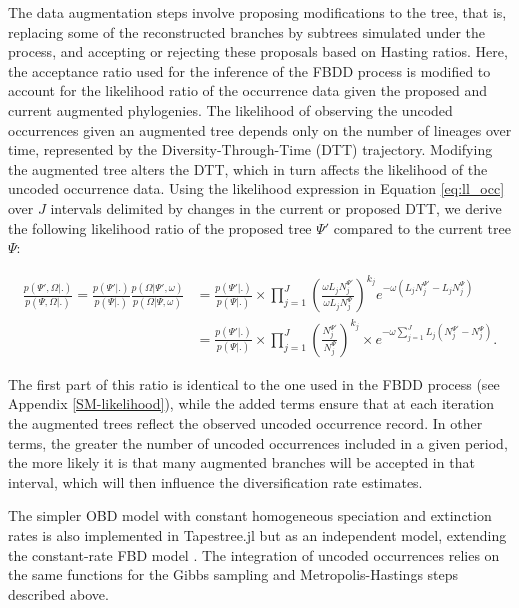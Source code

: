 \documentclass[oupdraft]{sysbio}
\newcommand{\revised}[1]{{\color{blue} #1}}
\begin{document}
The data augmentation steps involve proposing modifications to the tree, that is, replacing some of the reconstructed branches by subtrees simulated under the process, and accepting or rejecting these proposals based on Hasting ratios. Here, the acceptance ratio used for the inference of the FBDD process \citep{quintero_loss_2025} is modified to account for the likelihood ratio of the occurrence data given the proposed and current augmented phylogenies. The likelihood of observing the \revised{uncoded} occurrences given an augmented tree depends only on the number of lineages over time, represented by the Diversity-Through-Time (DTT) trajectory. Modifying the augmented tree alters the DTT, which in turn affects the likelihood of the \revised{uncoded} occurrence data. Using the likelihood expression in Equation \ref{eq:ll_occ} over $J$ intervals delimited by changes in the current or proposed DTT, we derive the following likelihood ratio of the proposed tree $\Psi'$ compared to the current tree $\Psi$:

\begin{align*}
\frac{p(\Psi', \Omega | . )}{p(\Psi, \Omega | . )} = \frac{p(\Psi'|.)}{p(\Psi|.)}\frac{p(\Omega|\Psi', \omega)}{p(\Omega|\Psi, \omega)} 
&= \frac{p(\Psi'|.)}{p(\Psi|.)} \times \prod_{j=1}^J \left( \frac{\omega L_j N_j^{\Psi'}}{\omega L_j N_j^{\Psi}} \right)^{k_j} e^{-\omega (L_j N_j^{\Psi'} - L_j N_j^{\Psi})}\\
&= \frac{p(\Psi'|.)}{p(\Psi|.)} \times \prod_{j=1}^J \left( \frac{N_j^{\Psi'}}{N_j^{\Psi}} \right)^{k_j} \times e^{-\omega \sum_{j=1}^J L_j(N_j^{\Psi'} - N_j^{\Psi})}.
\end{align*}

The first part of this ratio is identical to the one used in the FBDD process (see Appendix \ref{SM-likelihood}), while the added terms ensure that at each iteration the augmented trees reflect the observed \revised{uncoded} occurrence record. In other terms, the greater the number of \revised{uncoded} occurrences included in a given period, the more likely it is that many augmented branches will be accepted in that interval, which will then influence the diversification rate estimates.

The simpler OBD model with constant homogeneous speciation and extinction rates is also implemented in Tapestree.jl \citep{quintero_tapestreejl_2020} but as an independent model, extending the constant-rate FBD model \citep{quintero_loss_2025}. The integration of \revised{uncoded} occurrences relies on the same functions for the Gibbs sampling and Metropolis-Hastings steps described above.
\end{document}
